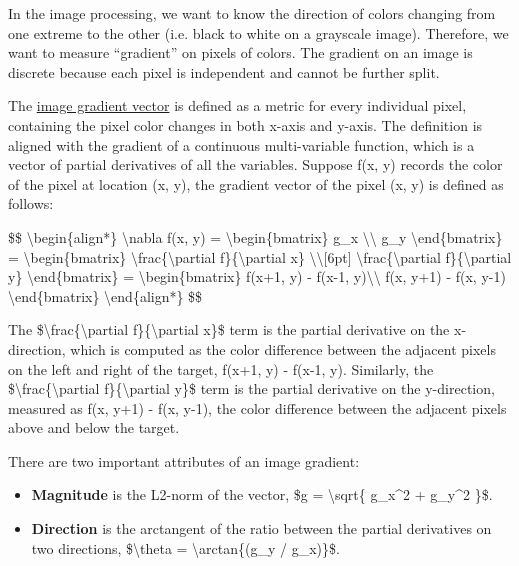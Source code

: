 In the image processing, we want to know the direction of colors changing from one extreme to the other (i.e. black to white on a grayscale image). Therefore, we want to measure ``gradient'' on pixels of colors. The gradient on an image is discrete because each pixel is independent and cannot be further split.

The \href{https://en.wikipedia.org/wiki/Image_gradient}{image gradient vector} is defined as a metric for every individual pixel, containing the pixel color changes in both x-axis and y-axis. The definition is aligned with the gradient of a continuous multi-variable function, which is a vector of partial derivatives of all the variables. Suppose f(x, y) records the color of the pixel at location (x, y), the gradient vector of the pixel (x, y) is defined as follows:

\$\$ \textbackslash begin\{align*\} \textbackslash nabla f(x, y) = \textbackslash begin\{bmatrix\} g\_x \textbackslash\textbackslash{} g\_y \textbackslash end\{bmatrix\} = \textbackslash begin\{bmatrix\} \textbackslash frac\{\textbackslash partial f\}\{\textbackslash partial x\} \textbackslash\textbackslash{[}6pt{]} \textbackslash frac\{\textbackslash partial f\}\{\textbackslash partial y\} \textbackslash end\{bmatrix\} = \textbackslash begin\{bmatrix\} f(x+1, y) - f(x-1, y)\textbackslash\textbackslash{} f(x, y+1) - f(x, y-1) \textbackslash end\{bmatrix\} \textbackslash end\{align*\} \$\$

The \$\textbackslash frac\{\textbackslash partial f\}\{\textbackslash partial x\}\$ term is the partial derivative on the x-direction, which is computed as the color difference between the adjacent pixels on the left and right of the target, f(x+1, y) - f(x-1, y). Similarly, the \$\textbackslash frac\{\textbackslash partial f\}\{\textbackslash partial y\}\$ term is the partial derivative on the y-direction, measured as f(x, y+1) - f(x, y-1), the color difference between the adjacent pixels above and below the target.

There are two important attributes of an image gradient:

\begin{itemize}
\tightlist
\item
  \textbf{Magnitude} is the L2-norm of the vector, \$g = \textbackslash sqrt\{ g\_x\^{}2 + g\_y\^{}2 \}\$.
\item
  \textbf{Direction} is the arctangent of the ratio between the partial derivatives on two directions, \$\textbackslash theta = \textbackslash arctan\{(g\_y / g\_x)\}\$.
\end{itemize}

